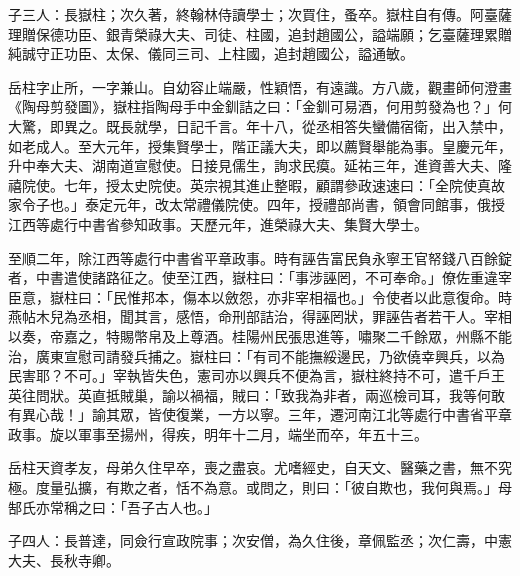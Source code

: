\begin{pinyinscope}
 子三人：長嶽柱；次久著，終翰林侍讀學士；次買住，蚤卒。嶽柱自有傳。阿臺薩理贈保德功臣、銀青榮祿大夫、司徒、柱國，追封趙國公，謚端願；乞臺薩理累贈純誠守正功臣、太保、儀同三司、上柱國，追封趙國公，謚通敏。



 岳柱字止所，一字兼山。自幼容止端嚴，性穎悟，有遠識。方八歲，觀畫師何澄畫《陶母剪發圖》，嶽柱指陶母手中金釧詰之曰：「金釧可易酒，何用剪發為也？」何大驚，即異之。既長就學，日記千言。年十八，從丞相答失蠻備宿衛，出入禁中，如老成人。至大元年，授集賢學士，階正議大夫，即以薦賢舉能為事。皇慶元年，升中奉大夫、湖南道宣慰使。日接見儒生，詢求民瘼。延祐三年，進資善大夫、隆禧院使。七年，授太史院使。英宗視其進止整暇，顧謂參政速速曰：「全院使真故家令子也。」泰定元年，改太常禮儀院使。四年，授禮部尚書，領會同館事，俄授江西等處行中書省參知政事。天歷元年，進榮祿大夫、集賢大學士。



 至順二年，除江西等處行中書省平章政事。時有誣告富民負永寧王官帑錢八百餘錠者，中書遣使諸路征之。使至江西，嶽柱曰：「事涉誣罔，不可奉命。」僚佐重違宰臣意，嶽柱曰：「民惟邦本，傷本以斂怨，亦非宰相福也。」令使者以此意復命。時燕帖木兒為丞相，聞其言，感悟，命刑部詰治，得誣罔狀，罪誣告者若干人。宰相以奏，帝嘉之，特賜幣帛及上尊酒。桂陽州民張思進等，嘯聚二千餘眾，州縣不能治，廣東宣慰司請發兵捕之。嶽柱曰：「有司不能撫綏邊民，乃欲僥幸興兵，以為民害耶？不可。」宰執皆失色，憲司亦以興兵不便為言，嶽柱終持不可，遣千戶王英往問狀。英直抵賊巢，諭以禍福，賊曰：「致我為非者，兩巡檢司耳，我等何敢有異心哉！」諭其眾，皆使復業，一方以寧。三年，遷河南江北等處行中書省平章政事。旋以軍事至揚州，得疾，明年十二月，端坐而卒，年五十三。



 岳柱天資孝友，母弟久住早卒，喪之盡哀。尤嗜經史，自天文、醫藥之書，無不究極。度量弘擴，有欺之者，恬不為意。或問之，則曰：「彼自欺也，我何與焉。」母郜氏亦常稱之曰：「吾子古人也。」



 子四人：長普達，同僉行宣政院事；次安僧，為久住後，章佩監丞；次仁壽，中憲大夫、長秋寺卿。



\end{pinyinscope}